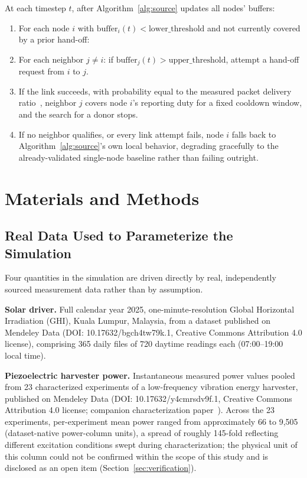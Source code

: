 \documentclass[electronics,article,submit,moreauthors]{Definitions/mdpi}
\begin{document}
\begin{Theorem}
\label{alg:broker}
At each timestep $t$, after Algorithm~\ref{alg:source} updates all nodes' buffers:
\begin{enumerate}
\item For each node $i$ with $\mathrm{buffer}_i(t) < \mathrm{lower\_threshold}$ and not currently covered by a prior hand-off:
\item \quad For each neighbor $j \neq i$: if $\mathrm{buffer}_j(t) > \mathrm{upper\_threshold}$, attempt a hand-off request from $i$ to $j$.
\item \quad\quad If the link succeeds, with probability equal to the measured packet delivery ratio~\cite{ref92}, neighbor $j$ covers node $i$'s reporting duty for a fixed cooldown window, and the search for a donor stops.
\item If no neighbor qualifies, or every link attempt fails, node $i$ falls back to Algorithm~\ref{alg:source}'s own local behavior, degrading gracefully to the already-validated single-node baseline rather than failing outright.
\end{enumerate}
\end{Theorem}

\section{Materials and Methods}
\label{sec:methods}

\subsection{Real Data Used to Parameterize the Simulation}

Four quantities in the simulation are driven directly by real, independently sourced measurement data rather than by assumption.

\textbf{Solar driver.} Full calendar year 2025, one-minute-resolution Global Horizontal Irradiation (GHI), Kuala Lumpur, Malaysia, from a dataset published on Mendeley Data (DOI: 10.17632/bgch4tw79k.1, Creative Commons Attribution 4.0 license), comprising 365 daily files of 720 daytime readings each (07:00--19:00 local time).

\textbf{Piezoelectric harvester power.} Instantaneous measured power values pooled from 23 characterized experiments of a low-frequency vibration energy harvester, published on Mendeley Data (DOI: 10.17632/y4cmrsdv9f.1, Creative Commons Attribution 4.0 license; companion characterization paper~\cite{ref59}). Across the 23 experiments, per-experiment mean power ranged from approximately 66 to 9{,}505 (dataset-native power-column units), a spread of roughly 145-fold reflecting different excitation conditions swept during characterization; the physical unit of this column could not be confirmed within the scope of this study and is disclosed as an open item (Section~\ref{sec:verification}).
\end{document}
